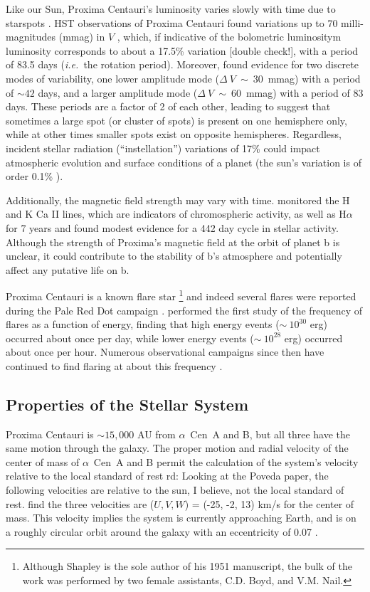 \documentclass[preprint,12pt]{aastex}
\newcommand{\xxx}[1]{{\color{red} #1}} %
\def\ie{{\it i.e.\ }}
\def\acen{{$\alpha$~Cen}}
\begin{document}
Like our Sun, Proxima Centauri's luminosity varies slowly with time
due to starspots \citep{Benedict93}. HST observations of Proxima
Centauri found variations up to 70 milli-magnitudes (mmag) in $V$
\citep{Benedict98}, which, if indicative of the bolometric luminositym
\xxx{luminosity}
corresponds to about a 17.5\% variation \xxx{[double check!]}, with a
period of 83.5 days (\ie the rotation period). Moreover,
\citep{Benedict98} found evidence for two discrete modes of
variability, one lower amplitude mode ($\Delta~V~\sim~30$~mmag) with a
period of $\sim 42$ days, and a larger amplitude mode
($\Delta~V~\sim~60$~mmag) with a period of 83 days. These periods are
a factor of 2 of each other, leading \cite{Benedict98} to suggest that
sometimes a large spot (or cluster of spots) is present on one
hemisphere only, while at other times smaller spots exist on opposite
hemispheres. Regardless, incident stellar radiation (``instellation'')
variations of 17\% could impact atmospheric evolution and surface
conditions of a planet (the sun's variation is of order 0.1\%
\citep{Willson81}).

Additionally, the magnetic field strength may vary with
time. \cite{Cincunegui07} monitored the H and K Ca II lines, which are
indicators of chromospheric activity, as well as H$\alpha$ for 7 years
and found modest evidence for a 442 day cycle in stellar
activity. Although the strength of Proxima's magnetic field at the
orbit of planet b is unclear, it could contribute to the stability of
b's atmosphere and potentially affect any putative life on b. 

Proxima Centauri is a known flare star
\citep{Shapley51}\footnote{Although Shapley is the sole author of his
  1951 manuscript, the bulk of the work was performed by two female
  assistants, C.D. Boyd, and V.M. Nail.}  and indeed several flares
were reported during the Pale Red Dot campaign
\citep{AngladaEscude16}. \cite{Walker81} performed the first study of
the frequency of flares as a function of energy, finding that high
energy events ($\sim~10^{30}$ erg) occurred about once per day, while
lower energy events ($\sim~10^{28}$ erg) occurred about once per
hour. Numerous observational campaigns since then have continued to
find flaring at about this frequency
\citep{Benedict98,AngladaEscude16,Davenport16}.

\subsection{Properties of the Stellar System}
\label{sec:obs:stellarsys}
Proxima Centauri is $\sim 15,000$ AU from \acen~A and B, but all three have the
same motion through the galaxy. The proper motion and radial
velocity of the center of mass of \acen~A and B permit the calculation
of the system's velocity relative to the local standard of
rest \xxx{rd: Looking at the Poveda paper, the following velocities are relative to the sun,
I believe, not the 
local standard of rest}. \cite{Poveda96} find the three velocities are ($U, V, W$) =
(-25, -2, 13) km/s for the center of mass. This velocity implies the
system is currently approaching Earth, and is on a roughly circular
orbit around the galaxy with an eccentricity of 0.07
\citep{AllenHerrera98}.
\end{document}

